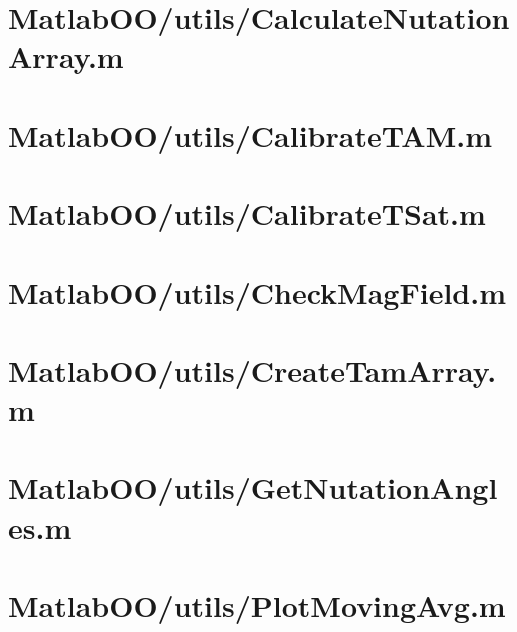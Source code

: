 \pagebreak
\section{MatlabOO/utils/CalculateNutationArray.m}\label{code:MatlabOO/utils/CalculateNutationArray.m}


\pagebreak
\section{MatlabOO/utils/CalibrateTAM.m}\label{code:MatlabOO/utils/CalibrateTAM.m}


\pagebreak
\section{MatlabOO/utils/CalibrateTSat.m}\label{code:MatlabOO/utils/CalibrateTSat.m}


\pagebreak
\section{MatlabOO/utils/CheckMagField.m}\label{code:MatlabOO/utils/CheckMagField.m}


\pagebreak
\section{MatlabOO/utils/CreateTamArray.m}\label{code:MatlabOO/utils/CreateTamArray.m}


\pagebreak
\section{MatlabOO/utils/GetNutationAngles.m}\label{code:MatlabOO/utils/GetNutationAngles.m}


\pagebreak
\section{MatlabOO/utils/PlotMovingAvg.m}\label{code:MatlabOO/utils/PlotMovingAvg.m}


